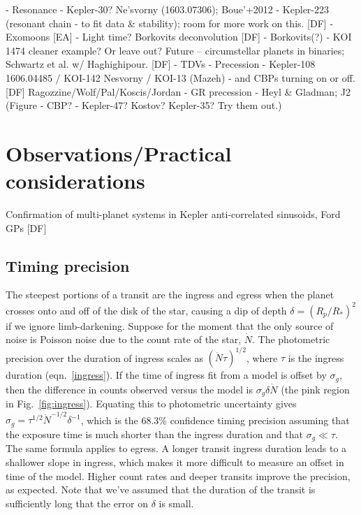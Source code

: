\documentclass[graybox,natbib,nosecnum]{svmult}
\begin{document}
    - Resonance - Kepler-30?  Ne'svorny (1603.07306); Boue'+2012 - Kepler-223 (resonant chain - to fit data \& stability); room for more work on this.  [DF]
    - Exomoons [EA]
    - Light time?  Borkovits deconvolution [DF]
    - Borkovits(?) - KOI 1474 {cleaner example?  Or leave out?  Future -- circumstellar planets in binaries; Schwartz et al. w/ Haghighipour.} [DF]     - TDVs
       - Precession - Kepler-108 {1606.04485} / KOI-142 {Nesvorny} / KOI-13 (Mazeh) - and CBPs turning on or off.  [DF]  Ragozzine/Wolf/Pal/Koscis/Jordan - GR precession - Heyl \& Gladman; J2  (Figure - CBP? - Kepler-47? Kostov? Kepler-35? Try them out.)

\section{Observations/Practical considerations} %
Confirmation of multi-planet systems in Kepler anti-correlated sinusoids, Ford GPs [DF]

\subsection{Timing precision}

The steepest portions of a transit are the ingress and egress when the planet crosses onto and
off of the disk of the star, causing a dip of depth $\delta = (R_p/R_*)^2$ if we ignore limb-darkening.   
Suppose for the moment that the only source of noise is Poisson noise due to the count rate of 
the star, $\dot N$.  The photometric precision over the duration of ingress scales as
$(\dot N \tau)^{1/2}$, where $\tau$ is the ingress duration (eqn.\ \ref{ingress}).  If the time of 
ingress fit from a model is offset by $\sigma_g$, then the difference in counts observed
versus the model is $\sigma_g \delta \dot N$ (the pink region in Fig.\ \ref{fig:ingress}).  Equating 
this to photometric uncertainty gives $\sigma_g = \tau^{1/2} \dot N^{-1/2} \delta^{-1}$, which
is the 68.3\% confidence timing precision assuming that the exposure time is much shorter than the
ingress duration and that $\sigma_g \ll \tau$.  The same formula applies to egress. A longer transit 
ingress duration leads to a shallower slope in ingress, which makes it more difficult to measure an 
offset in time of the model.  Higher count rates and deeper transits improve the precision, as 
expected.  Note that we've assumed that the duration of the transit is sufficiently long that the 
error on $\delta$ is small.
\end{document}

